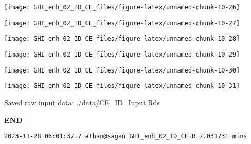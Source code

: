 \documentclass[
  10pt,
  a4paper,oneside]{article}
\begin{document}
\begin{center}\texttt{[image: GHI\_enh\_02\_ID\_CE\_files/figure-latex/unnamed-chunk-10-26]} \end{center}

\begin{center}\texttt{[image: GHI\_enh\_02\_ID\_CE\_files/figure-latex/unnamed-chunk-10-27]} \end{center}

\begin{center}\texttt{[image: GHI\_enh\_02\_ID\_CE\_files/figure-latex/unnamed-chunk-10-28]} \end{center}

\begin{center}\texttt{[image: GHI\_enh\_02\_ID\_CE\_files/figure-latex/unnamed-chunk-10-29]} \end{center}

\begin{center}\texttt{[image: GHI\_enh\_02\_ID\_CE\_files/figure-latex/unnamed-chunk-10-30]} \end{center}

\begin{center}\texttt{[image: GHI\_enh\_02\_ID\_CE\_files/figure-latex/unnamed-chunk-10-31]} \end{center}

Saved raw input data: ./data/CE\_ID\_Input.Rds

\textbf{END}

\begin{verbatim}
2023-11-28 06:01:37.7 athan@sagan GHI_enh_02_ID_CE.R 7.031731 mins
\end{verbatim}
\end{document}

